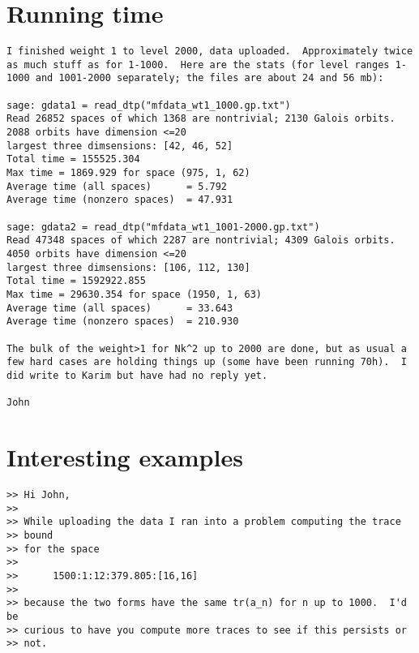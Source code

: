 \documentclass[11pt]{amsart}
\numberwithin{equation}{subsection}
\theoremstyle{definition}
\begin{document}
\section{Running time}

\begin{verbatim}
I finished weight 1 to level 2000, data uploaded.  Approximately twice as much stuff as for 1-1000.  Here are the stats (for level ranges 1-1000 and 1001-2000 separately; the files are about 24 and 56 mb):

sage: gdata1 = read_dtp("mfdata_wt1_1000.gp.txt")
Read 26852 spaces of which 1368 are nontrivial; 2130 Galois orbits.
2088 orbits have dimension <=20
largest three dimsensions: [42, 46, 52]
Total time = 155525.304
Max time = 1869.929 for space (975, 1, 62)
Average time (all spaces)      = 5.792
Average time (nonzero spaces)  = 47.931

sage: gdata2 = read_dtp("mfdata_wt1_1001-2000.gp.txt")
Read 47348 spaces of which 2287 are nontrivial; 4309 Galois orbits.
4050 orbits have dimension <=20
largest three dimsensions: [106, 112, 130]
Total time = 1592922.855
Max time = 29630.354 for space (1950, 1, 63)
Average time (all spaces)      = 33.643
Average time (nonzero spaces)  = 210.930

The bulk of the weight>1 for Nk^2 up to 2000 are done, but as usual a few hard cases are holding things up (some have been running 70h).  I did write to Karim but have had no reply yet.

John
\end{verbatim}

\section{Interesting examples}

\begin{verbatim}
>> Hi John,
>> 
>> While uploading the data I ran into a problem computing the trace 
>> bound
>> for the space
>> 
>>      1500:1:12:379.805:[16,16]
>> 
>> because the two forms have the same tr(a_n) for n up to 1000.  I'd be
>> curious to have you compute more traces to see if this persists or 
>> not.
\end{verbatim}

\begin{thebibliography}{999}

\end{thebibliography}
\end{document}
